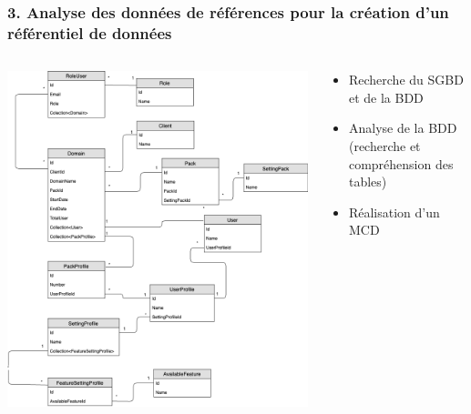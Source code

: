 \documentclass[aspectratio=169]{beamer}
\begin{document}
\begin{frame}
  \frametitle{3. Analyse des données de références pour la création d’un référentiel de données}
  \begin{columns}
    \begin{column}{0.5\textwidth}
      \includegraphics[height=0.65\textheight, center]{Imgs/ralph-diagram.png}
    \end{column}
    \begin{column}{0.5\textwidth}
      \begin{itemize}
        \item Recherche du SGBD et de la BDD
        \item Analyse de la BDD (recherche et compréhension des tables)
        \item Réalisation d'un MCD
      \end{itemize}
    \end{column}
  \end{columns}
\end{frame}
\end{document}

